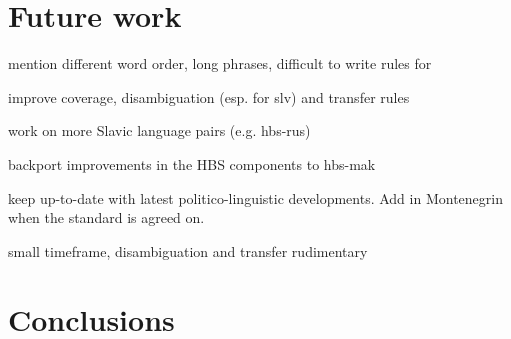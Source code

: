 \section{Future work}

mention different word order, long phrases, difficult to write rules for

improve coverage, disambiguation (esp. for slv) and transfer rules

work on more Slavic language pairs (e.g. hbs-rus)

backport improvements in the HBS components to hbs-mak

keep up-to-date with latest politico-linguistic developments. Add in
 Montenegrin when the standard is agreed on.

small timeframe, disambiguation and transfer rudimentary

\section{Conclusions}
